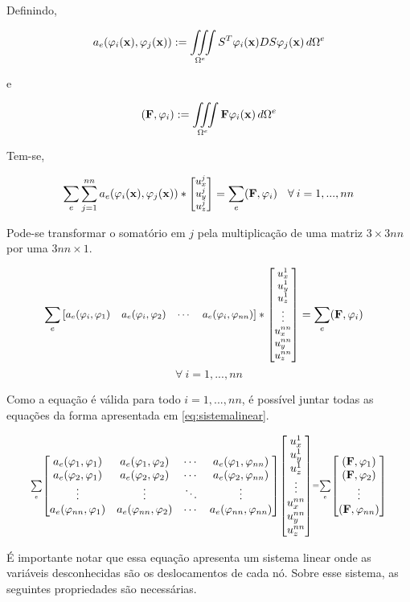 Definindo,

\begin{equation} \label{eq:ae_def}
 a_e(\varphi_i(\mathbf{x}),\varphi_j(\mathbf{x})) := \iiint\limits_{\Omega^e} S^T\varphi_i(\mathbf{x}) D S\varphi_j(\mathbf{x}) \, d\Omega^e  
\end{equation}

e

\begin{equation}
(\mathbf{F}, \varphi_{i}) := \iiint\limits_{\Omega^e} \mathbf{F}\varphi_i(\mathbf{x}) \, d\Omega^e
\end{equation}

Tem-se,

\begin{equation}\small
\sum\limits_e \sum_{j=1}^{nn} a_e(\varphi_i(\mathbf{x}),\varphi_j(\mathbf{x}))  * \begin{bmatrix} u^j_x \\ u^j_y \\ u^j_z \end{bmatrix}  
=  \sum\limits_e (\mathbf{F}, \varphi_{i}) \quad \forall \: i=1,...,nn
\end{equation}


Pode-se transformar o somatório em $j$ pela multiplicação de uma matriz $3\times3nn$ por uma $3nn\times1$.

\begin{equation}\small
\sum\limits_e  \begin{bmatrix} a_e(\varphi_{i}, \varphi_{1}) & a_e(\varphi_{i}, \varphi_{2}) & \cdots & a_e(\varphi_{i}, \varphi_{nn}) \end{bmatrix}  * \begin{bmatrix} u^{1}_x \\ u^{1}_y \\ u^{1}_z \\ \vdots\\ u^{nn}_x \\ u^{nn}_y \\ u^{nn}_z \end{bmatrix}
=  \sum\limits_e (\mathbf{F}, \varphi_{i}) \quad 
\end{equation}
\begin{equation*}
  \forall \: i=1,...,nn   
\end{equation*}


Como a equação é válida para todo $i=1,...,nn$, é possível juntar todas as equações da forma apresentada em \ref{eq:sistemalinear}.

\begin{equation}\scriptstyle
\sum\limits_e\aemat\libvetor = \sum\limits_e \begin{bmatrix}
\ldint[1] \\
\ldint[2] \\
\vdots    \\
\ldint[nn]
\end{bmatrix}
\label{eq:sistemalinear}
\end{equation}

É importante notar que essa equação apresenta um sistema linear onde as variáveis desconhecidas são os deslocamentos de cada nó. Sobre esse sistema, as seguintes propriedades são necessárias.

